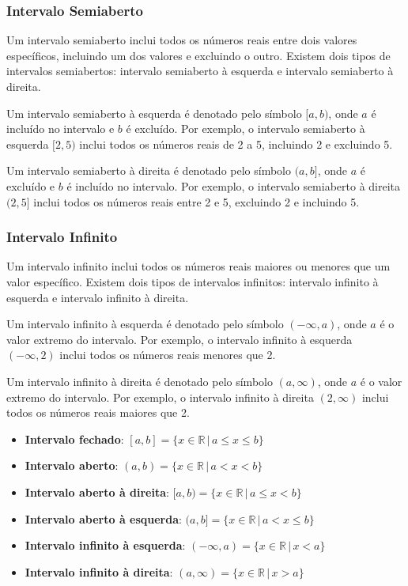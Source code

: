 \documentclass[12pt]{article}
\begin{document}
\subsubsection{Intervalo Semiaberto}

Um intervalo semiaberto inclui todos os números reais entre dois valores específicos, incluindo um dos valores e excluindo o outro. Existem dois tipos de intervalos semiabertos: intervalo semiaberto à esquerda e intervalo semiaberto à direita.

Um intervalo semiaberto à esquerda é denotado pelo símbolo $[a, b)$, onde $a$ é incluído no intervalo e $b$ é excluído. Por exemplo, o intervalo semiaberto à esquerda $[2, 5)$ inclui todos os números reais de 2 a 5, incluindo 2 e excluindo 5.

Um intervalo semiaberto à direita é denotado pelo símbolo $(a, b]$, onde $a$ é excluído e $b$ é incluído no intervalo. Por exemplo, o intervalo semiaberto à direita $(2, 5]$ inclui todos os números reais entre 2 e 5, excluindo 2 e incluindo 5.

\subsubsection{Intervalo Infinito}

Um intervalo infinito inclui todos os números reais maiores ou menores que um valor específico. Existem dois tipos de intervalos infinitos: intervalo infinito à esquerda e intervalo infinito à direita.

Um intervalo infinito à esquerda é denotado pelo símbolo $(-\infty, a)$, onde $a$ é o valor extremo do intervalo. Por exemplo, o intervalo infinito à esquerda $(-\infty, 2)$ inclui todos os números reais menores que 2.

Um intervalo infinito à direita é denotado pelo símbolo $(a, \infty)$, onde $a$ é o valor extremo do intervalo. Por exemplo, o intervalo infinito à direita $(2, \infty)$ inclui todos os números reais maiores que 2.

\begin{itemize}
    \item \textbf{Intervalo fechado}: $[a, b] = \{x \in \mathbb{R} \,|\, a \leq x \leq b\}$
    \item \textbf{Intervalo aberto}: $(a, b) = \{x \in \mathbb{R} \,|\, a < x < b\}$
    \item \textbf{Intervalo aberto à direita}: $[a, b) = \{x \in \mathbb{R} \,|\, a \leq x < b\}$
    \item \textbf{Intervalo aberto à esquerda}: $(a, b] = \{x \in \mathbb{R} \,|\, a < x \leq b\}$
    \item \textbf{Intervalo infinito à esquerda}: $(-\infty, a) = \{x \in \mathbb{R} \,|\, x < a\}$
    \item \textbf{Intervalo infinito à direita}: $(a, \infty) = \{x \in \mathbb{R} \,|\, x > a\}$
\end{itemize}
\end{document}
